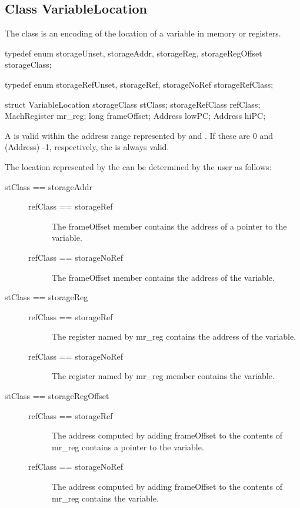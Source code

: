 \subsection{Class VariableLocation}\label{VariableLocation}

The  class is an encoding of the location of a variable in memory or registers. 

\begin{apient}
typedef enum {
   storageUnset,
   storageAddr,
   storageReg,
   storageRegOffset
} storageClass;
	
typedef enum {
   storageRefUnset,
   storageRef,
   storageNoRef
} storageRefClass;

struct VariableLocation  {
    storageClass stClass;
    storageRefClass refClass;
    MachRegister mr_reg;
    long frameOffset;
    Address lowPC;
	Address hiPC;
}
\end{apient}

A  is valid within the address range represented by  and . If these are 0 and (Address) -1, respectively, the  is always valid. 

The location represented by the  can be determined by the user as follows:

\begin{description}
	\item[stClass == storageAddr]
	\begin{description}
		\item[refClass == storageRef] The frameOffset member contains the address of a pointer to the variable. 
		\item[refClass == storageNoRef] The frameOffset member contains the address of the variable. 
	\end{description}
	\item[stClass == storageReg]
	\begin{description}
		\item[refClass == storageRef] The register named by mr\_reg  contains the address of the variable. 
		\item[refClass == storageNoRef] The register named by mr\_reg member contains the variable. 
	\end{description}
	\item[stClass == storageRegOffset] 
	\begin{description}
		\item[refClass == storageRef] The address computed by adding frameOffset to the contents of mr\_reg contains a pointer to the variable. 
		\item[refClass == storageNoRef] The address computed by adding frameOffset to the contents of mr\_reg contains the variable.  
	\end{description}
\end{description}
